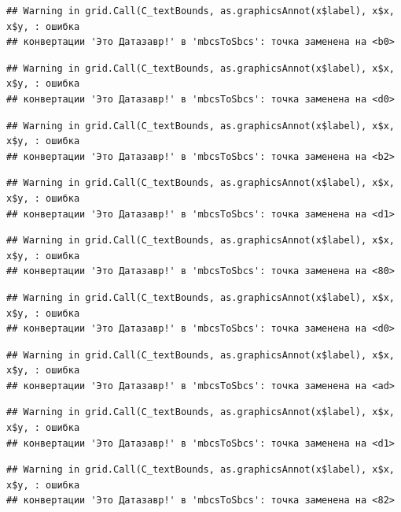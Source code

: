 \documentclass[]{book}
\begin{document}
\begin{verbatim}
## Warning in grid.Call(C_textBounds, as.graphicsAnnot(x$label), x$x, x$y, : ошибка
## конвертации 'Это Датазавр!' в 'mbcsToSbcs': точка заменена на <b0>
\end{verbatim}

\begin{verbatim}
## Warning in grid.Call(C_textBounds, as.graphicsAnnot(x$label), x$x, x$y, : ошибка
## конвертации 'Это Датазавр!' в 'mbcsToSbcs': точка заменена на <d0>
\end{verbatim}

\begin{verbatim}
## Warning in grid.Call(C_textBounds, as.graphicsAnnot(x$label), x$x, x$y, : ошибка
## конвертации 'Это Датазавр!' в 'mbcsToSbcs': точка заменена на <b2>
\end{verbatim}

\begin{verbatim}
## Warning in grid.Call(C_textBounds, as.graphicsAnnot(x$label), x$x, x$y, : ошибка
## конвертации 'Это Датазавр!' в 'mbcsToSbcs': точка заменена на <d1>
\end{verbatim}

\begin{verbatim}
## Warning in grid.Call(C_textBounds, as.graphicsAnnot(x$label), x$x, x$y, : ошибка
## конвертации 'Это Датазавр!' в 'mbcsToSbcs': точка заменена на <80>
\end{verbatim}

\begin{verbatim}
## Warning in grid.Call(C_textBounds, as.graphicsAnnot(x$label), x$x, x$y, : ошибка
## конвертации 'Это Датазавр!' в 'mbcsToSbcs': точка заменена на <d0>
\end{verbatim}

\begin{verbatim}
## Warning in grid.Call(C_textBounds, as.graphicsAnnot(x$label), x$x, x$y, : ошибка
## конвертации 'Это Датазавр!' в 'mbcsToSbcs': точка заменена на <ad>
\end{verbatim}

\begin{verbatim}
## Warning in grid.Call(C_textBounds, as.graphicsAnnot(x$label), x$x, x$y, : ошибка
## конвертации 'Это Датазавр!' в 'mbcsToSbcs': точка заменена на <d1>
\end{verbatim}

\begin{verbatim}
## Warning in grid.Call(C_textBounds, as.graphicsAnnot(x$label), x$x, x$y, : ошибка
## конвертации 'Это Датазавр!' в 'mbcsToSbcs': точка заменена на <82>
\end{verbatim}
\end{document}
